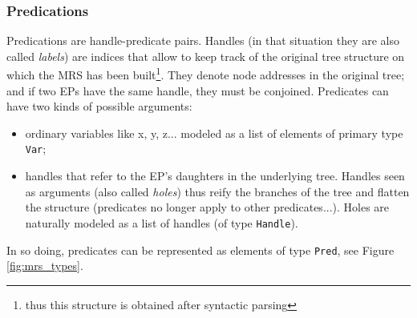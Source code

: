 \documentclass[11pt]{article}
\begin{document}
			\subsubsection{Predications}
				Predications are handle-predicate pairs. Handles (in that situation they are also called \textit{labels}) are indices that allow to keep track of the original tree structure on which the MRS has been built\footnote{thus this structure is obtained after syntactic parsing}. They denote node addresses in the original tree; and if two EPs have the same handle, they must be conjoined. Predicates can have two kinds of possible arguments:
				\begin{itemize}
					\item ordinary variables like x, y, z... modeled as a list of elements of primary type \texttt{Var}; \vspace{-2mm}
					\item handles that refer to the EP's daughters in the underlying tree. Handles seen as arguments (also called \textit{holes}) thus reify the branches of the tree and flatten the structure (predicates no longer apply to other predicates...). Holes are naturally modeled as a list of handles (of type \texttt{Handle}).
				\end{itemize}
				In so doing, predicates can be represented as elements of type \texttt{Pred}, see Figure \ref{fig:mrs_types}.
\end{document}
